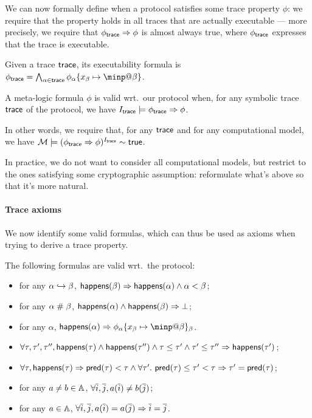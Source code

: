 We can now formally define when a protocol satisfies some trace property
$\phi$:
we require that the property holds in all traces that are actually executable
--- more precisely, we require that $\phi_{\textsf{trace}} \Rightarrow \phi$ is almost
always true, where $\phi_{\textsf{trace}}$ expresses that the trace is executable.

\begin{definition}
  Given a trace $\textsf{trace}$, its executability formula
  is $\phi_\tr = \bigwedge_{\alpha\in\tr}
  \phi_\alpha\{x_\beta\mapsto\minp@\beta\}$.
\end{definition}

\begin{definition}
  A meta-logic formula $\phi$ is valid wrt.\ our protocol when,
  for any symbolic trace $\textsf{trace}$ of the protocol,
  we have $I_{\textsf{trace}} \models \phi_{\textsf{trace}} \Rightarrow \phi$.
\end{definition}

In other words, we require that, for any $\textsf{trace}$ and
for any computational model,
we have $\mathcal{M} \models (\phi_{\textsf{trace}}\Rightarrow\phi)^{I_{\textsf{trace}}} \sim \textsf{true}$.

In practice, we do not want to consider all computational models, but
restrict to the ones satisfying some cryptographic assumption: reformulate
what's above so that it's more natural.

\paragraph{Trace axioms}

We now identify some valid formulas, which can thus be used as axioms
when trying to derive a trace property.

\begin{proposition}
  The following formulas are valid wrt.\ the protocol:
  \begin{itemize}
    \item for any $\alpha \hookrightarrow \beta$,
      $\textsf{happens}(\beta) \Rightarrow \textsf{happens}(\alpha) \wedge \alpha < \beta$;
    \item for any $\alpha \mathrel{\#} \beta$,
      $\textsf{happens}(\alpha)\wedge\textsf{happens}(\beta) \Rightarrow \bot$;
    \item for any $\alpha$,
      $\happens(\alpha) \Rightarrow
      \phi_\alpha\{x_\beta\mapsto\minp@\beta\}_\beta$.
    \item
      $\forall \tau,\tau',\tau'', \textsf{happens}(\tau)\wedge\textsf{happens}(\tau'')\wedge
      \tau\leq\tau'\wedge\tau'\leq\tau''\Rightarrow\textsf{happens}(\tau')$;
    \item
      $\forall \tau, \textsf{happens}(\tau) \Rightarrow \textsf{pred}(\tau)<\tau \wedge
      \forall \tau'.~ \textsf{pred}(\tau)\leq\tau'<\tau \Rightarrow
      \tau'=\textsf{pred}(\tau)$;
    \item for any $a\neq b\in\mathbb{A}$,
      $\forall \overline{i},\overline{j}, a(\overline{i})\neq b(\overline{j})$;
    \item for any $a\in\mathbb{A}$,
      $\forall \overline{i},\overline{j}, a(\overline{i})=a(\overline{j}) \Rightarrow \overline{i}=\overline{j}$.
  \end{itemize}
\end{proposition}

